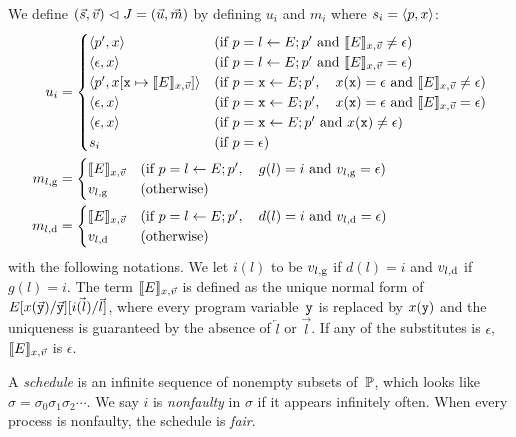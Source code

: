 We define $
(\vec s, \vec v) \vartriangleleft J = (\vec u, \vec m)
$ by defining
$u_i$ and $m_i$
where $s_i = \langle{p,x}\rangle$:
\begin{align*}
 u_i & =
 \begin{cases}
 \langle{p',x}\rangle  & (\text{if } p = l
 \leftarrow E; p' \text{ and }\llbracket{E}\rrbracket_{x,\vec v} \neq \epsilon)
 \\
 \langle{\epsilon,x}\rangle  & (\text{if } p = l
 \leftarrow E; p' \text{ and }\llbracket{E}\rrbracket_{x,\vec v} = \epsilon)
 \\
 \langle{p', x[\texttt{x} \mapsto \llbracket{E}\rrbracket_{x, \vec v}]}\rangle&
                       (\text{if } p = \texttt{x} \leftarrow E; p', \quad
 x(\texttt{x}) = \epsilon  \text{ and } \llbracket{E}\rrbracket_{x, \vec v} \neq \epsilon) \\
 \langle{\epsilon, x}\rangle&
                      (\text{if } p = \texttt{x} \leftarrow E; p',  \quad
 x(\texttt{x}) = \epsilon  \text{ and } \llbracket{E}\rrbracket_{x, \vec v} = \epsilon) \\
 \langle{\epsilon, x}\rangle & (\text{if } p = \texttt{x} \leftarrow E; p' \text{
 and }
 x(\texttt{x}) \neq \epsilon) \\
 s_i & (\text{if } p = \epsilon)
 \end{cases}\\
 {m}_{l, \mathrm g} & =
 \begin{cases}
 \llbracket{E}\rrbracket_{x, \vec v} & (\text{if } p = l \leftarrow E; p',\quad g(l)= i \text{
 and } {v}_{l, \mathrm g} = \epsilon) \\
 {v}_{l, \mathrm g} &(\text{otherwise})
 \end{cases}\\
 {m}_{l, \mathrm d} &=
 \begin{cases}
\llbracket{E}\rrbracket_{x, \vec v} &
  (\text{if } p = l \leftarrow E; p',\quad d(l)= i \text{
 and } {v}_{l, \mathrm d} = \epsilon) \\
 {v}_{l, \mathrm d} &(\text{otherwise})
 \end{cases}
\end{align*}
with the following notations.
We let $i(l)$ to be ${v}_{l, \mathrm g}$ if $d(l)=i$ and
${v}_{l, \mathrm d}$ if $g(l) = i$.
The term
$\llbracket{E}\rrbracket_{x, \vec v}$ is defined as the unique normal form
of $E[x(\vec{\texttt{y}}) / \vec{\texttt{y}}][\vec{i(l)}/\vec l]$, where
every program variable~$\texttt{y}$ is replaced by $x(\texttt{y})$ and the
uniqueness is guaranteed by the absence of $\overleftarrow l$ or
$\overrightarrow l$.
If any of the substitutes is $\epsilon$,
$\llbracket{E}\rrbracket_{x, \vec v}$ is $\epsilon$.

A \textit{schedule} is an infinite sequence of nonempty subsets of~$\mathbb{P}$,
which looks like $\sigma = \sigma_0\sigma_1\sigma_2\cdots$.
We say $i$ is \textit{nonfaulty} in $\sigma$
if it appears infinitely often.
When every process is nonfaulty, the schedule is \textit{fair}.

